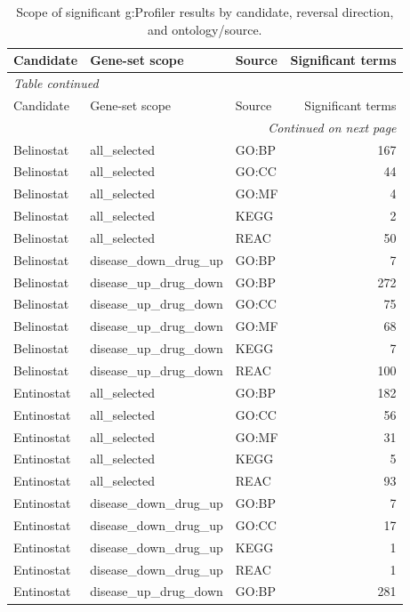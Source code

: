 \begingroup
\scriptsize
\renewcommand{\arraystretch}{0.82}
\begin{longtable}{@{}lllr@{}}
\caption{Scope of significant g:Profiler results by candidate, reversal direction, and ontology/source.}\label{tab:s_path_scope}\\
\toprule
Candidate & Gene-set scope & Source & Significant terms \\
\midrule
\endfirsthead
\multicolumn{4}{l}{\textit{Table continued}}\\
\toprule
Candidate & Gene-set scope & Source & Significant terms \\
\midrule
\endhead
\midrule
\multicolumn{4}{r}{\textit{Continued on next page}}\\
\endfoot
\bottomrule
\endlastfoot
Belinostat & all\_selected & GO:BP & 167 \\
Belinostat & all\_selected & GO:CC & 44 \\
Belinostat & all\_selected & GO:MF & 4 \\
Belinostat & all\_selected & KEGG & 2 \\
Belinostat & all\_selected & REAC & 50 \\
Belinostat & disease\_down\_drug\_up & GO:BP & 7 \\
Belinostat & disease\_up\_drug\_down & GO:BP & 272 \\
Belinostat & disease\_up\_drug\_down & GO:CC & 75 \\
Belinostat & disease\_up\_drug\_down & GO:MF & 68 \\
Belinostat & disease\_up\_drug\_down & KEGG & 7 \\
Belinostat & disease\_up\_drug\_down & REAC & 100 \\
Entinostat & all\_selected & GO:BP & 182 \\
Entinostat & all\_selected & GO:CC & 56 \\
Entinostat & all\_selected & GO:MF & 31 \\
Entinostat & all\_selected & KEGG & 5 \\
Entinostat & all\_selected & REAC & 93 \\
Entinostat & disease\_down\_drug\_up & GO:BP & 7 \\
Entinostat & disease\_down\_drug\_up & GO:CC & 17 \\
Entinostat & disease\_down\_drug\_up & KEGG & 1 \\
Entinostat & disease\_down\_drug\_up & REAC & 1 \\
Entinostat & disease\_up\_drug\_down & GO:BP & 281 \\

\end{longtable}
